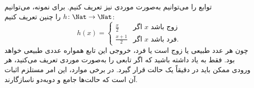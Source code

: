\documentclass[../../../include/open-logic-section]{subfiles}
\begin{document}
\begin{ex}
توابع را می‌توانیم به‌صورت موردی نیز تعریف کنیم. برای نمونه، می‌توانیم
$h \colon \Nat \to \Nat$ را چنین تعریف کنیم:
\[
h(x) =
\begin{cases}
  \frac{x}{2} & \text{اگر $x$ زوج باشد} \\
  \frac{x+1}{2} & \text{اگر $x$ فرد باشد.}
\end{cases}
\]
چون هر عدد طبیعی یا زوج است یا فرد، خروجی این
تابع همواره عددی طبیعی خواهد بود. فقط به یاد داشته باشید که اگر
تابعی را به‌صورت موردی تعریف می‌کنید، هر ورودی ممکن باید در
دقیقاً یک حالت قرار گیرد. در برخی موارد، این امر مستلزم اثبات آن است که
حالت‌ها جامع و دوبه‌دو ناسازگارند.
\end{ex}
\end{document}
